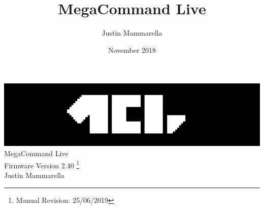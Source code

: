 \documentclass[openany,a4paper,12pt]{book}
\begin{document}
\author{Justin Mammarella}
\title{MegaCommand Live}
\date{November 2018}

\frontmatter
\begin{titlepage}

	\begin{center}
	\vspace*{5.75cm}
	\includegraphics{mcl_logo_black_short.png}
    \vspace*{1.00cm}
	\LARGE
	\vspace*{0.65cm}
	\\MegaCommand Live
    \large
	\\Firmware Version 2.40
	\footnote{Manual Revision: 25/06/2019}
    \vspace*{2cm}
    \\Justin Mammarella
\end{center}
\end{titlepage}


\tableofcontents

\mainmatter
































\backmatter

\end{document}
